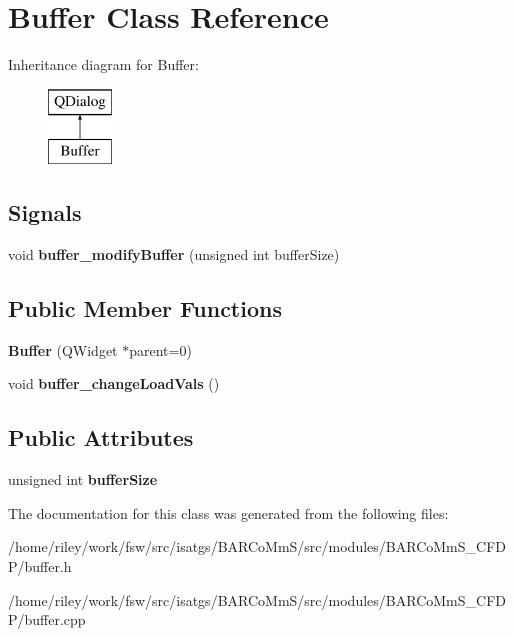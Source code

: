 \hypertarget{class_buffer}{}\section{Buffer Class Reference}
\label{class_buffer}
Inheritance diagram for Buffer\+:\begin{figure}[H]
\begin{center}
\leavevmode
\includegraphics[height=2.000000cm]{class_buffer}
\end{center}
\end{figure}
\subsection*{Signals}
\begin{DoxyCompactItemize}
\item 
void {\bfseries buffer\+\_\+modify\+Buffer} (unsigned int buffer\+Size)\hypertarget{class_buffer_ac717991545d4c5351af9a713b91b2782}{}\label{class_buffer_ac717991545d4c5351af9a713b91b2782}

\end{DoxyCompactItemize}
\subsection*{Public Member Functions}
\begin{DoxyCompactItemize}
\item 
{\bfseries Buffer} (Q\+Widget $\ast$parent=0)\hypertarget{class_buffer_a70e8ab4821634d4d44b76d12e08a4dfe}{}\label{class_buffer_a70e8ab4821634d4d44b76d12e08a4dfe}

\item 
void {\bfseries buffer\+\_\+change\+Load\+Vals} ()\hypertarget{class_buffer_a52c5a7a3121aa5f9fc5cc39b1f5a801e}{}\label{class_buffer_a52c5a7a3121aa5f9fc5cc39b1f5a801e}

\end{DoxyCompactItemize}
\subsection*{Public Attributes}
\begin{DoxyCompactItemize}
\item 
unsigned int {\bfseries buffer\+Size}\hypertarget{class_buffer_a811467a3681514d9f7d1fed6fa0189d7}{}\label{class_buffer_a811467a3681514d9f7d1fed6fa0189d7}

\end{DoxyCompactItemize}


The documentation for this class was generated from the following files\+:\begin{DoxyCompactItemize}
\item 
/home/riley/work/fsw/src/isatgs/\+B\+A\+R\+Co\+Mm\+S/src/modules/\+B\+A\+R\+Co\+Mm\+S\+\_\+\+C\+F\+D\+P/buffer.\+h\item 
/home/riley/work/fsw/src/isatgs/\+B\+A\+R\+Co\+Mm\+S/src/modules/\+B\+A\+R\+Co\+Mm\+S\+\_\+\+C\+F\+D\+P/buffer.\+cpp\end{DoxyCompactItemize}
